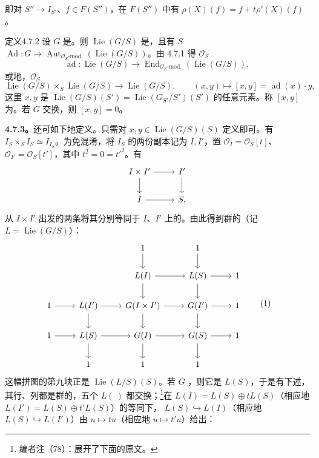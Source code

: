 即对 $S''\to I_{S'}$、$f\in F(S'')$，在 $F(S'')$ 中有 $\rho(X)(f)=f+t\rho'(X)(f)$。
\begin{SGAresult}{定义}{4.7.2}
设 $G$ 是。则 $\operatorname{Lie}(G/S)$ 是，且有 $S$  $\operatorname{Ad}:G\to\operatorname{Aut}_{\mathcal O_S\text{-mod.}}(\operatorname{Lie}(G/S))$。由 4.7.1 得 $\mathcal O_S$ 
\[\operatorname{ad}:\operatorname{Lie}(G/S)\to\operatorname{End}_{\mathcal O_S\text{-mod.}}(\operatorname{Lie}(G/S)),\]
或地，$\mathcal O_S$ 
\[\operatorname{Lie}(G/S)\times_S\operatorname{Lie}(G/S)\to\operatorname{Lie}(G/S),\qquad(x,y)\mapsto[x,y]=\operatorname{ad}(x)\cdot y,\]
这里 $x,y$ 是 $\operatorname{Lie}(G/S)(S')=\operatorname{Lie}(G_{S'}/S')(S')$ 的任意元素。称 $[x,y]$ 为。若 $G$ 交换，则 $[x,y]=0$。
\end{SGAresult}
\textbf{4.7.3。}还可如下地定义。只需对 $x,y\in\operatorname{Lie}(G/S)(S)$ 定义即可。有 $I_S\times_SI_S\simeq I_{I_S}$。为免混淆，将 $I_S$ 的两份副本记为 $I,I'$，置 $\mathcal O_I=\mathcal O_S[t]$、$\mathcal O_{I'}=\mathcal O_S[t']$，其中 $t^2=0=t'^2$。有
\[\begin{tikzcd}
I\times I'\arrow[r]\arrow[d]&I'\arrow[d]\\I\arrow[r]&S,
\end{tikzcd}\]
从 $I\times I'$ 出发的两条将其分别等同于 $I$、$I'$ 上的。由此得到群的（记 $L=\operatorname{Lie}(G/S)$）：
\[\begin{tikzcd}
&&1\arrow[d]&1\arrow[d]&\\
&&L(I)\arrow[d]\arrow[r]&L(S)\arrow[d]\arrow[r]&1\\
1\arrow[r]&L(I')\arrow[r]\arrow[d]&G(I\times I')\arrow[r]\arrow[d]&G(I')\arrow[r]\arrow[d]&1\\
1\arrow[r]&L(S)\arrow[r]\arrow[d]&G(I)\arrow[r]\arrow[d]&G(S)\arrow[r]\arrow[d]&1\\
&1&1&1&
\end{tikzcd}\tag{1}\]
这幅拼图的第九块正是 $\operatorname{Lie}(L/S)(S)$。若 $G$ ，则它是 $L(S)$，于是有下述，其行、列都是群的，五个 $L(\ )$ 都交换；\footnote{编者注（78）：展开了下面的原文。}在 $L(I)=L(S)\oplus tL(S)$（相应地 $L(I')=L(S)\oplus t'L(S)$）的等同下， $L(S)\hookrightarrow L(I)$（相应地 $L(S)\hookrightarrow L(I')$）由 $u\mapsto tu$（相应地 $u\mapsto t'u$）给出：
